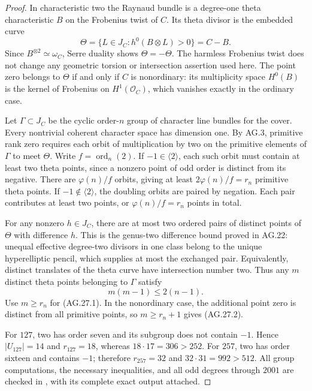 \begin{proof}
In characteristic two the Raynaud bundle is a degree-one
theta characteristic $B$ on the Frobenius twist of $C$.
Its theta divisor is the embedded curve
\[
 \Theta=\{L\in J_C:h^0(B\otimes L)>0\}=C-B.
\]
Since $B^{\otimes2}\simeq\omega_C$, Serre duality shows
$\Theta=-\Theta$. The harmless Frobenius twist does not
change any geometric torsion or intersection assertion
used here. The point zero belongs to $\Theta$ if and
only if $C$ is nonordinary: its multiplicity space
$H^0(B)$ is the kernel of Frobenius on $H^1(\mathcal O_C)$,
which vanishes exactly in the ordinary case.

Let $\Gamma\subset J_C$ be the cyclic order-$n$ group
of character line bundles for the cover. Every nontrivial
coherent character space has dimension one. By AG.3,
primitive rank zero requires each orbit of multiplication
by two on the primitive elements of $\Gamma$ to meet
$\Theta$. Write $f=\operatorname{ord}_n(2)$. If
$-1\in\langle2\rangle$, each such orbit must contain
at least two theta points, since a nonzero point of odd
order is distinct from its negative. There are
$\varphi(n)/f$ orbits, giving at least
$2\varphi(n)/f=r_n$ primitive theta points. If
$-1\notin\langle2\rangle$, the doubling orbits are
paired by negation. Each pair contributes at least two
points, or $\varphi(n)/f=r_n$ points in total.

For any nonzero $h\in J_C$, there are at most two
ordered pairs of distinct points of $\Theta$ with
difference $h$. This is the genus-two difference bound
proved in AG.22: unequal effective degree-two divisors
in one class belong to the unique hyperelliptic pencil,
which supplies at most the exchanged pair. Equivalently,
distinct translates of the theta curve have intersection
number two. Thus any $m$ distinct theta points belonging
to $\Gamma$ satisfy
\[
                         m(m-1)\le2(n-1).
\]
Use $m\ge r_n$ for (AG.27.1). In the nonordinary case,
the additional point zero is distinct from all primitive
points, so $m\ge r_n+1$ gives (AG.27.2).

For $127$, two has order seven and its subgroup does
not contain $-1$. Hence $|U_{127}|=14$ and $r_{127}=18$,
whereas $18\cdot17=306>252$. For $257$, two has
order sixteen and contains $-1$; therefore $r_{257}=32$
and $32\cdot31=992>512$. All group computations,
the necessary inequalities, and all odd degrees through
$2001$ are checked in
, with its
complete exact output attached.


\end{proof}
